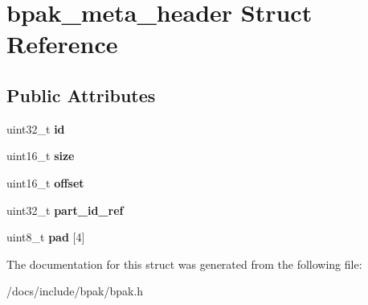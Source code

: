 \hypertarget{structbpak__meta__header}{}\section{bpak\+\_\+meta\+\_\+header Struct Reference}
\label{structbpak__meta__header}
\subsection*{Public Attributes}
\begin{DoxyCompactItemize}
\item 
\mbox{\label{structbpak__meta__header_a09fa79e5a595a4ded89d6172a869e88a}} 
uint32\+\_\+t {\bfseries id}
\item 
\mbox{\label{structbpak__meta__header_a5e3cb950483b8b7ae2c391d15773c662}} 
uint16\+\_\+t {\bfseries size}
\item 
\mbox{\label{structbpak__meta__header_a5d7fc4e7f9c1503128da45c46c61f399}} 
uint16\+\_\+t {\bfseries offset}
\item 
\mbox{\label{structbpak__meta__header_a545d5ea02e9638e13ae05856124c4ea0}} 
uint32\+\_\+t {\bfseries part\+\_\+id\+\_\+ref}
\item 
\mbox{\label{structbpak__meta__header_a1802976bb3359ba75a40e212bf34cc0c}} 
uint8\+\_\+t {\bfseries pad} \mbox{[}4\mbox{]}
\end{DoxyCompactItemize}


The documentation for this struct was generated from the following file\+:\begin{DoxyCompactItemize}
\item 
/docs/include/bpak/bpak.\+h\end{DoxyCompactItemize}
